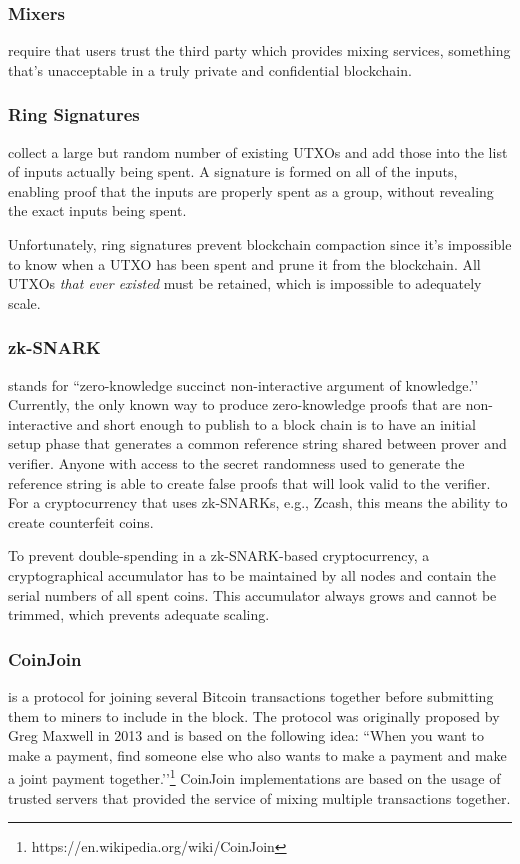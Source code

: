 \documentclass[8pt,fleqn,openany]{book}
\begin{document}
\subsubsection{Mixers} require that users trust the third party which provides mixing services, something that’s unacceptable in a truly private and confidential blockchain.
	
\subsubsection{Ring Signatures} collect a large but random number of existing UTXOs and add those into the list of inputs actually being spent. A signature is formed on all of the inputs, enabling proof that the inputs are properly spent as a group, without revealing the exact inputs being spent. 

Unfortunately, ring signatures prevent blockchain compaction since it’s impossible to know when a UTXO has been spent and prune it from the blockchain. All UTXOs \textit{that ever existed} must be retained, which is impossible to adequately scale.

\subsubsection{zk-SNARK} stands for ``zero-knowledge succinct non-interactive argument of knowledge.’’ Currently, the only known way to produce zero-knowledge proofs that are non-interactive and short enough to publish to a block chain is to have an initial setup phase that generates a common reference string shared between prover and verifier. Anyone with access to the secret randomness used to generate the reference string is able to create false proofs that will look valid to the verifier. For a cryptocurrency that uses zk-SNARKs, e.g., Zcash, this means the ability to create counterfeit coins. 

To prevent double-spending in a zk-SNARK-based cryptocurrency, a cryptographical accumulator has to be maintained by all nodes and contain the serial numbers of all spent coins. This accumulator always grows and cannot be trimmed, which prevents adequate scaling.

\subsubsection{CoinJoin} is a protocol for joining several Bitcoin transactions together before submitting them to miners to include in the block. The protocol was originally proposed by Greg Maxwell in 2013 and is based on the following idea: ``When you want to make a payment, find someone else who also wants to make a payment and make a joint payment together.’’\footnote{https://en.wikipedia.org/wiki/CoinJoin} CoinJoin implementations are based on the usage of trusted servers that provided the service of mixing multiple transactions together.
\end{document}
